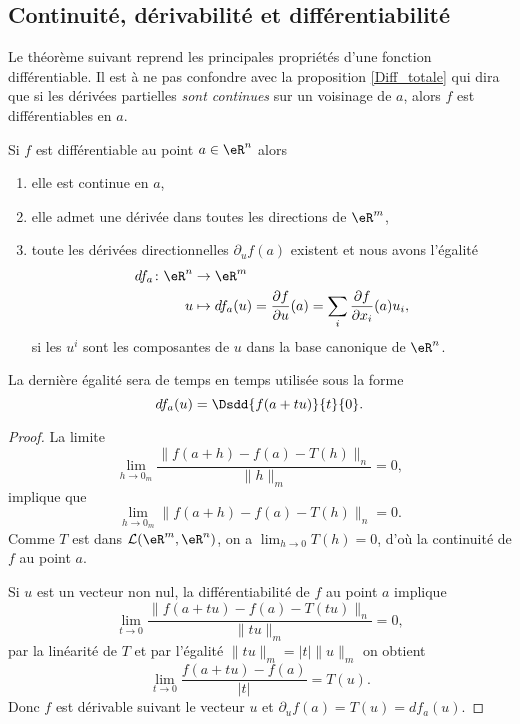 \subsection{Continuité, dérivabilité et différentiabilité}

Le théorème suivant reprend les principales propriétés d'une fonction différentiable. Il est à ne pas confondre avec la proposition \ref{Diff_totale} qui dira que si les dérivées partielles \emph{sont continues} sur un voisinage de $a$, alors $f$ est différentiables en $a$.
\begin{proposition}\label{diff1}\label{ThoRapPropDiffSi}
    Si $f$ est différentiable au point $a\in \eR^n$ alors
    \begin{enumerate}
        \item
            elle est continue en \( a\),
        \item
            elle admet une dérivée dans toutes les directions de \( \eR^m\),
\item  toute les dérivées directionnelles $\partial_uf(a)$ existent et nous avons l'égalité
\begin{equation}        \label{EqDiffPartRap} 
    \begin{aligned}   
        df_a\colon \eR^n&\to \eR^m \\
        u&\mapsto df_a(u)=\frac{ \partial f }{ \partial u }(a)=\sum_i \frac{ \partial f }{ \partial x_i }(a)u_i,
    \end{aligned}
\end{equation}
si les $u^i$ sont les composantes de $u$ dans la base canonique de $\eR^n$.

    \end{enumerate}
\end{proposition}

La dernière égalité sera de temps en temps utilisée sous la forme
\begin{equation}    \label{EqOWQSoMA}
    df_a(u)=\Dsdd{ f(a+tu) }{t}{0}.
\end{equation}

\begin{proof}
  La limite
\[
\lim_{h\to 0_m}\frac{\|f(a+h)-f(a)-T(h)\|_n}{\|h\|_m}=0,
\]
implique que
 \[
\lim_{h\to 0_m}\|f(a+h)-f(a)-T(h)\|_n=0.
\]
Comme $T$ est dans $\mathcal{L}(\eR^m,\eR^n)$, on a $\lim_{h\to 0}T(h)=0$, d'où la continuité de $f$ au point $a$.

Si $u$ est un vecteur non nul, la différentiabilité de $f$ au point $a$ implique
\[
\lim_{t\to 0}\frac{\|f(a+tu)-f(a)-T(tu)\|_n}{\|tu\|_m}=0,
\]
par la linéarité de $T$ et par l'égalité $\|tu\|_m=|t|\|u\|_m$ on obtient
\[
\lim_{t\to 0}\frac{f(a+tu)-f(a)}{|t|}= T(u).
\]
Donc $f$ est dérivable suivant le vecteur $u$ et $\partial_uf(a)=T(u)=df_a(u)$.
\end{proof}

